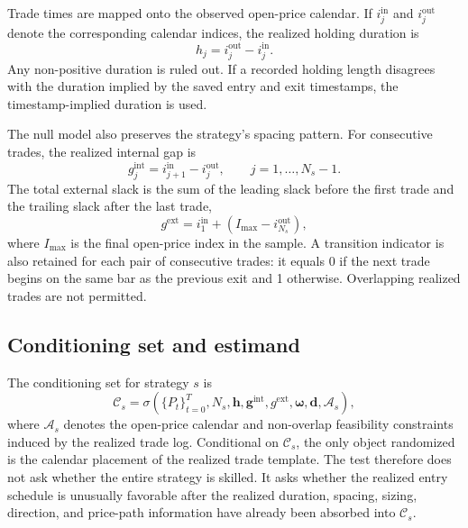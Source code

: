 \documentclass[preprint,12pt]{elsarticle}
\theoremstyle{definition}
\begin{document}
Trade times are mapped onto the observed open-price calendar. If \(i^{\mathrm{in}}_j\) and \(i^{\mathrm{out}}_j\) denote the corresponding calendar indices, the realized holding duration is
\begin{equation}
h_j=i^{\mathrm{out}}_j-i^{\mathrm{in}}_j.
\end{equation}
Any non-positive duration is ruled out. If a recorded holding length disagrees with the duration implied by the saved entry and exit timestamps, the timestamp-implied duration is used.

The null model also preserves the strategy's spacing pattern. For consecutive trades, the realized internal gap is
\begin{equation}
g^{\mathrm{int}}_j=i^{\mathrm{in}}_{j+1}-i^{\mathrm{out}}_j,\qquad j=1,\ldots,N_s-1.
\end{equation}
The total external slack is the sum of the leading slack before the first trade and the trailing slack after the last trade,
\begin{equation}
g^{\mathrm{ext}} = i^{\mathrm{in}}_1 + \left(I_{\max}-i^{\mathrm{out}}_{N_s}\right),
\end{equation}
where \(I_{\max}\) is the final open-price index in the sample. A transition indicator is also retained for each pair of consecutive trades: it equals 0 if the next trade begins on the same bar as the previous exit and 1 otherwise. Overlapping realized trades are not permitted.

\subsection{Conditioning set and estimand}
\label{sec:conditioning-estimand}

The conditioning set for strategy $s$ is
\[
\mathcal{C}_s =
\sigma\!\left(
\{P_t\}_{t=0}^{T},
N_s,
\mathbf{h},
\mathbf{g}^{\mathrm{int}},
g^{\mathrm{ext}},
\boldsymbol{\omega},
\mathbf{d},
\mathcal{A}_s
\right),
\]
where $\mathcal{A}_s$ denotes the open-price calendar and non-overlap feasibility constraints induced by the realized trade log. Conditional on $\mathcal{C}_s$, the only object randomized is the calendar placement of the realized trade template. The test therefore does not ask whether the entire strategy is skilled. It asks whether the realized entry schedule is unusually favorable after the realized duration, spacing, sizing, direction, and price-path information have already been absorbed into $\mathcal{C}_s$.
\end{document}
